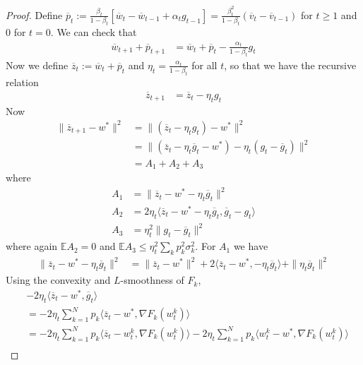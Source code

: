 \begin{proof}
	Define $\overline{p}_{t}:=\frac{\beta_{t}}{1-\beta_{t}}\left[\overline{w}_{t}-\overline{w}_{t-1}+\alpha_{t}g_{t-1}\right]=\frac{\beta_{t}^{2}}{1-\beta_{t}}(\overline{v}_{t}-\overline{v}_{t-1})$
	for $t\geq1$ and 0 for $t=0$. We can check that 
	\begin{align*}
	\overline{w}_{t+1}+\overline{p}_{t+1} & =\overline{w}_{t}+\overline{p}_{t}-\frac{\alpha_{t}}{1-\beta_{t}}g_{t}
	\end{align*}
	Now we define $\overline{z}_{t}:=\overline{w}_{t}+\overline{p}_{t}$
	and $\eta_{t}=\frac{\alpha_{t}}{1-\beta_{t}}$ for all $t$, so that
	we have the recursive relation 
	\begin{align*}
	\overline{z}_{t+1} & =\overline{z}_{t}-\eta_{t}g_{t}
	\end{align*}
	Now 
	\begin{align*}
	\|\overline{z}_{t+1}-w^{\ast}\|^{2} & =\|(\overline{z}_{t}-\eta_{t}g_{t})-w^{\ast}\|^{2}\\
	& =\|(\overline{z}_{t}-\eta_{t}\overline{g}_{t}-w^{\ast})-\eta_{t}(g_{t}-\overline{g}_{t})\|^{2}\\
	& =A_{1}+A_{2}+A_{3}
	\end{align*}
	where 
	\begin{align*}
	A_{1} & =\|\overline{z}_{t}-w^{\ast}-\eta_{t}\overline{g}_{t}\|^{2}\\
	A_{2} & =2\eta_{t}\langle\overline{z}_{t}-w^{\ast}-\eta_{t}\overline{g}_{t},\overline{g}_{t}-g_{t}\rangle\\
	A_{3} & =\eta_{t}^{2}\|g_{t}-\overline{g}_{t}\|^{2}
	\end{align*}
	where again $\mathbb{E}A_{2}=0$ and $\mathbb{E}A_{3}\leq\eta_{t}^{2}\sum_{k}p_{k}^{2}\sigma_{k}^{2}$.
	For $A_{1}$ we have 
	\begin{align*}
	\|\overline{z}_{t}-w^{\ast}-\eta_{t}\overline{g}_{t}\|^{2} & =\|\overline{z}_{t}-w^{\ast}\|^{2}+2\langle\overline{z}_{t}-w^{\ast},-\eta_{t}\overline{g}_{t}\rangle+\|\eta_{t}\overline{g}_{t}\|^{2}
	\end{align*}
	Using the convexity and $L$-smoothness of $F_{k}$, 
	\begin{align*}
	& -2\eta_{t}\langle\overline{z}_{t}-w^{\ast},\overline{g}_{t}\rangle\\
	& =-2\eta_{t}\sum_{k=1}^{N}p_{k}\langle\overline{z}_{t}-w^{\ast},\nabla F_{k}(w_{t}^{k})\rangle\\
	& =-2\eta_{t}\sum_{k=1}^{N}p_{k}\langle\overline{z}_{t}-w_{t}^{k},\nabla F_{k}(w_{t}^{k})\rangle-2\eta_{t}\sum_{k=1}^{N}p_{k}\langle w_{t}^{k}-w^{\ast},\nabla F_{k}(w_{t}^{k})\rangle\\

\end{align*}
\end{proof}
